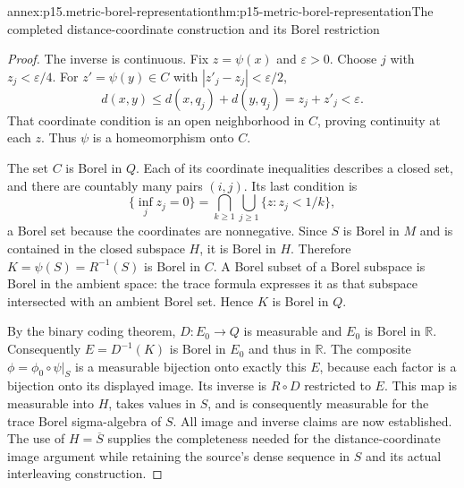 \begin{annexitem}{annex:p15.metric-borel-representation}{thm:p15-metric-borel-representation}{The completed distance-coordinate construction and its Borel restriction}
\begin{proof}
The inverse is continuous. Fix \(z=\psi(x)\) and
\(\varepsilon>0\). Choose \(j\) with \(z_j<\varepsilon/4\).
For \(z'=\psi(y)\in C\) with
\(|z'_j-z_j|<\varepsilon/2\),
\[
 d(x,y)\leq d(x,q_j)+d(y,q_j)=z_j+z'_j<\varepsilon.
\]
That coordinate condition is an open neighborhood in \(C\),
proving continuity at each \(z\). Thus \(\psi\) is
a homeomorphism onto \(C\).

The set \(C\) is Borel in \(Q\). Each of its coordinate
inequalities describes a closed set, and there are countably
many pairs \((i,j)\). Its last condition is
\[
 \{\inf_jz_j=0\}=\bigcap_{k\geq1}\bigcup_{j\geq1}
                                      \{z:z_j<1/k\},
\]
a Borel set because the coordinates are nonnegative. Since
\(S\) is Borel in \(M\) and is contained in the closed
subspace \(H\), it is Borel in \(H\). Therefore
\(K=\psi(S)=R^{-1}(S)\) is Borel in \(C\).
A Borel subset of a Borel subspace is Borel in the ambient
space: the trace formula expresses it as that subspace intersected
with an ambient Borel set. Hence \(K\) is Borel in \(Q\).

By the binary coding theorem, \(D:E_0\to Q\) is measurable
and \(E_0\) is Borel in \(\mathbb R\). Consequently
\(E=D^{-1}(K)\) is Borel in \(E_0\) and thus in
\(\mathbb R\). The composite \(\phi=\phi_0\circ\psi|_S\)
is a measurable bijection onto exactly this \(E\), because
each factor is a bijection onto its displayed image. Its inverse
is \(R\circ D\) restricted to \(E\). This map is measurable
into \(H\), takes values in \(S\), and is consequently
measurable for the trace Borel sigma-algebra of \(S\).
All image and inverse claims are now established. The use of
\(H=\overline S\) supplies the completeness needed for the
distance-coordinate image argument while retaining the source's
dense sequence in \(S\) and its actual interleaving construction.
\end{proof}
\end{annexitem}

